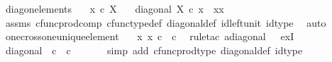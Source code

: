 \begin{isabellebody}
%
\endisatagproof
{\isafoldproof}%
%
\isadelimproof
%
\endisadelimproof
%
\isadelimdocument
%
\endisadelimdocument
%
\isatagdocument
%
\isamarkuptrue%
%
\endisatagdocument
{\isafolddocument}%
%
\isadelimdocument
%
\endisadelimdocument
{}\isamarkupfalse%
\ diag{\isacharunderscore}{\kern0pt}on{\isacharunderscore}{\kern0pt}elements{\isacharcolon}{\kern0pt}\isanewline
\ \ \ {\isachardoublequoteopen}x\ {\isasymin}\isactrlsub c\ X{\isachardoublequoteclose}\isanewline
\ \ \ {\isachardoublequoteopen}diagonal\ X\ {\isasymcirc}\isactrlsub c\ x\ {\isacharequal}{\kern0pt}\ {\isasymlangle}x{\isacharcomma}{\kern0pt}x{\isasymrangle}{\isachardoublequoteclose}\isanewline
%
\isadelimproof
\ \ %
\endisadelimproof
%
\isatagproof
{}\isamarkupfalse%
\ assms\ cfunc{\isacharunderscore}{\kern0pt}prod{\isacharunderscore}{\kern0pt}comp\ cfunc{\isacharunderscore}{\kern0pt}type{\isacharunderscore}{\kern0pt}def\ diagonal{\isacharunderscore}{\kern0pt}def\ id{\isacharunderscore}{\kern0pt}left{\isacharunderscore}{\kern0pt}unit\ id{\isacharunderscore}{\kern0pt}type\ \isamarkupfalse%
\ auto%
\endisatagproof
{\isafoldproof}%
%
\isadelimproof
\isanewline
%
\endisadelimproof
\isanewline
{}\isamarkupfalse%
\ one{\isacharunderscore}{\kern0pt}cross{\isacharunderscore}{\kern0pt}one{\isacharunderscore}{\kern0pt}unique{\isacharunderscore}{\kern0pt}element{\isacharcolon}{\kern0pt}\isanewline
\ \ {\isachardoublequoteopen}{\isasymexists}{\isacharbang}{\kern0pt}\ x{\isachardot}{\kern0pt}\ x\ {\isasymin}\isactrlsub c\ {\isasymone}\ {\isasymtimes}\isactrlsub c\ {\isasymone}{\isachardoublequoteclose}\isanewline
%
\isadelimproof
%
\endisadelimproof
%
\isatagproof
{}\isamarkupfalse%
\ {\isacharparenleft}{\kern0pt}rule{\isacharunderscore}{\kern0pt}tac\ a{\isacharequal}{\kern0pt}{\isachardoublequoteopen}diagonal\ {\isasymone}{\isachardoublequoteclose}\ \ ex{}I{\isacharparenright}{\kern0pt}\isanewline
\ \ \isamarkupfalse%
\ {\isachardoublequoteopen}diagonal\ {\isasymone}\ {\isasymin}\isactrlsub c\ {\isasymone}\ {\isasymtimes}\isactrlsub c\ {\isasymone}{\isachardoublequoteclose}\isanewline
\ \ \ \ \isamarkupfalse%
\ {\isacharparenleft}{\kern0pt}simp\ add{\isacharcolon}{\kern0pt}\ cfunc{\isacharunderscore}{\kern0pt}prod{\isacharunderscore}{\kern0pt}type\ diagonal{\isacharunderscore}{\kern0pt}def\ id{\isacharunderscore}{\kern0pt}type{\isacharparenright}{\kern0pt}\isanewline

\end{isabellebody}
